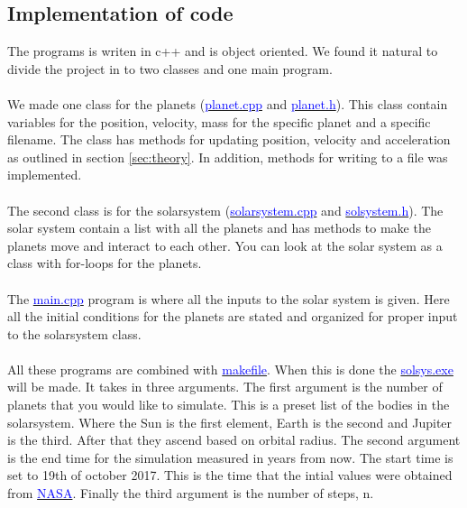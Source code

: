 \subsection{Implementation of code}

The programs is writen in c++ and is object oriented. We found it natural to divide the project in to two classes and one main program. 
\\
\\
We made one class for the planets (\href{https://github.com/erikfsk/Project-3/blob/master/Project3/planet.cpp}{\textcolor{blue}{planet.cpp}} and \href{https://github.com/erikfsk/Project-3/blob/master/Project3/planet.h}{\textcolor{blue}{planet.h}}). This class contain variables for the position, velocity, mass for the specific planet and a specific filename. The class has methods for updating position, velocity and acceleration as outlined in section \ref{sec:theory}. In addition, methods for writing to a file was implemented. 
\\
\\
The second class is for the solarsystem (\href{https://github.com/erikfsk/Project-3/blob/master/Project3/solarsystem.cpp}{\textcolor{blue}{solarsystem.cpp}} and \href{https://github.com/erikfsk/Project-3/blob/master/Project3/solarsystem.h}{\textcolor{blue}{solsystem.h}}). The solar system contain a list with all the planets and has methods to make the planets move and interact to each other. You can look at the solar system as a class with for-loops for the planets. 
\\
\\
The \href{https://github.com/erikfsk/Project-3/blob/master/Project3/main.cpp}{\textcolor{blue}{main.cpp}} program is where all the inputs to the solar system is given. Here all the initial conditions for the planets are stated and organized for proper input to the solarsystem class.
\\
\\
All these programs are combined with \href{https://github.com/erikfsk/Project-3/blob/master/Project3/makefile}{\textcolor{blue}{makefile}}. When this is done the \href{https://github.com/erikfsk/Project-3/blob/master/Project3/solsys.exe}{\textcolor{blue}{solsys.exe}} will be made. It takes in three arguments. The first argument is the number of planets that you would like to simulate. This is a preset list of the bodies in the solarsystem. Where the Sun is the first element, Earth is the second and Jupiter is the third. After that they ascend based on orbital radius. The second argument is the end time for the simulation measured in years from now. The start time is set to 19th of october 2017. This is the time that the intial values were obtained from \href{https://ssd.jpl.nasa.gov/horizons.cgi#top}{\textcolor{blue}{NASA}}. Finally the third argument is the number of steps, n. 
